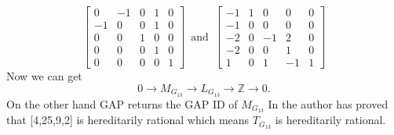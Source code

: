 \documentclass{article}
\theoremstyle{plain}
\theoremstyle{definition}
\newcommand{\Z}{\ensuremath{\mathbb{Z}}}
\newcommand{\tand}{\ensuremath{\,\,\, \text{and} \,\,\,}}
\newcommand{\exactseq}[1]{\ensuremath{0 \longrightarrow M_{#1} \longrightarrow L_{#1} \longrightarrow \Z \longrightarrow 0}}
\begin{document}
$$
\left[ \begin {array}{cccc|c} 0&-1&0&1&0\\  -1&0&0&1&0
\\  0&0&1&0&0\\  0&0&0&1&0
\\  \hline 0&0&0&0&1\end {array} \right] 
\tand
 \left[ \begin {array}{cccc|c} -1&1&0&0&0\\  -1&0&0&0&0
\\  -2&0&-1&2&0\\  -2&0&0&1&0
\\ \hline  1&0&1&-1&1\end {array} \right] 
$$
Now we can get 
$$\exactseq{G_{13}}.$$
On the other hand GAP returns the GAP ID of $M_{G_{13}}$ 
In \cite{Nicole1} the author has proved that [4,25,9,2] is hereditarily rational which means $T_{G_{13}}$ is hereditarily rational.
%
%  
%
\end{document}
